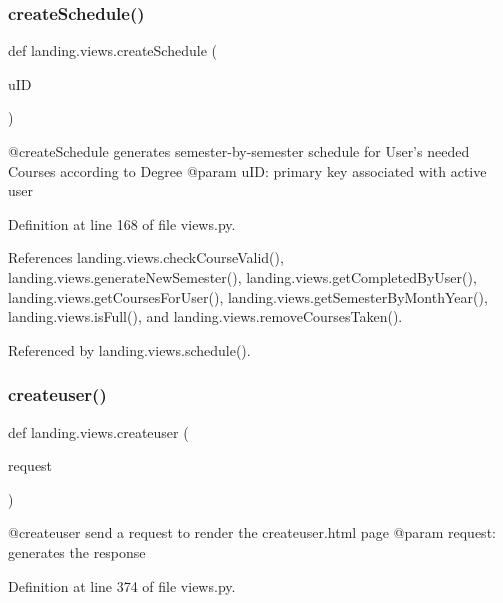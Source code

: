 \subsubsection{\texorpdfstring{create\+Schedule()}{createSchedule()}}
{\footnotesize\ttfamily def landing.\+views.\+create\+Schedule (\begin{DoxyParamCaption}\item[{}]{u\+ID }\end{DoxyParamCaption})}

\begin{DoxyVerb}@createSchedule generates semester-by-semester schedule for User's needed Courses according to Degree
@param uID: primary key associated with active user
\end{DoxyVerb}
 

Definition at line 168 of file views.\+py.



References landing.\+views.\+check\+Course\+Valid(), landing.\+views.\+generate\+New\+Semester(), landing.\+views.\+get\+Completed\+By\+User(), landing.\+views.\+get\+Courses\+For\+User(), landing.\+views.\+get\+Semester\+By\+Month\+Year(), landing.\+views.\+is\+Full(), and landing.\+views.\+remove\+Courses\+Taken().



Referenced by landing.\+views.\+schedule().

\mbox{\label{namespacelanding_1_1views_acd4507dea8fb635a81455db7918ee43c}} 
\subsubsection{\texorpdfstring{createuser()}{createuser()}}
{\footnotesize\ttfamily def landing.\+views.\+createuser (\begin{DoxyParamCaption}\item[{}]{request }\end{DoxyParamCaption})}

\begin{DoxyVerb}@createuser send a request to render the createuser.html page
@param request: generates the response
\end{DoxyVerb}
 

Definition at line 374 of file views.\+py.



